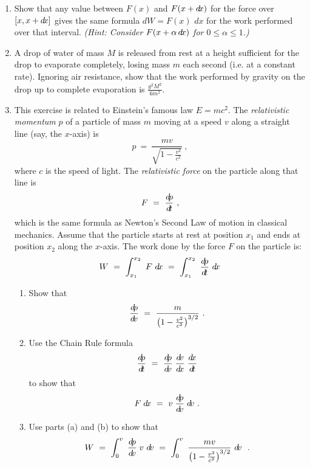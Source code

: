 {\begin{enumerate}[\bfseries 1.]
\[\begin{cases}
~0 & \text{elsewhere}\end{cases}
\]
for positive constants $a$ and $b$, where $B(a,b)$ is the
Beta function. Show that $E\lbrack X\rbrack = \frac{a}{a+b}$.
 \item Show that any value between $F(x)$ and $F(x+d\!x)$ for the force over
  $\lbrack x,x+d\!x \rbrack$ gives the same formula $d\!W = F(x)\,\,dx$ for the work
  performed over that interval. \emph{(Hint: Consider $F(x+\alpha\,d\!x)$ for
  $0\le\alpha\le 1$.)}
 \item A drop of water of mass $M$ is released from rest at a height sufficient
  for the drop to evaporate completely, losing mass $m$ each second (i.e. at a
  constant rate). Ignoring air resistance, show that the work performed by
  gravity on the drop up to complete evaporation is $\frac{g^2 M^2}{6 m^2}$.
\newpage
 \item This exercise is related to Einstein's famous law $E = mc^2$.
 The \emph{relativistic momentum} $p$ of a
  particle of mass $m$ moving at a speed $v$ along a straight line (say, the $x$-axis) is
  \begin{displaymath}
   p ~=~ \dfrac{mv}{\sqrt{1 - \frac{v^2}{c^2}}} ~,
  \end{displaymath}
  where $c$ is the speed of light. The \emph{relativistic force} on the particle along that line is
  \begin{displaymath}
   F ~=~ \dfrac{d\!p}{d\!t} ~,
  \end{displaymath}
  which is the same formula as Newton's Second Law of motion in classical mechanics.
  Assume that the particle starts at rest at position $x_1$ and ends at position $x_2$ along
  the $x$-axis. The work done by the force $F$ on the particle is:
  \begin{displaymath}
   W ~=~ \displaystyle\int_{x_1}^{x_2}~F~d\!x ~=~ \displaystyle\int_{x_1}^{x_2}~\dfrac{d\!p}{d\!t}~d\!x
  \end{displaymath}
  \begin{enumerate}[\bfseries (a)]
   \item Show that
\[
\dfrac{d\!p}{d\!v} ~=~ \dfrac{m}{\left(1 - \frac{v^2}{c^2}\right)^{3/2}} ~.
\]
   \item Use the Chain Rule formula
\[
\dfrac{d\!p}{\dt} ~=~ \dfrac{d\!p}{\dv}\;\dfrac{\dv}{\dx}\;\dfrac{\dx}{\dt}
\]
to show that
\[
F\;d\!x ~=~ v\;\dfrac{d\!p}{d\!v}\;d\!v ~.
\]
   \item Use parts (a) and (b) to show that
\[
W ~=~ \displaystyle\int_{0}^{v}~\dfrac{d\!p}{d\!v}\;v~d\!v ~=~
    \displaystyle\int_{0}^{v}~\dfrac{mv}{\left(1 - \frac{v^2}{c^2}\right)^{3/2}}~d\!v ~~.
\]
\end{enumerate}
\end{enumerate}}
